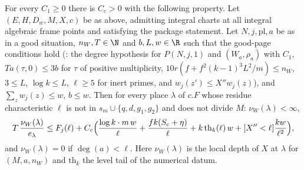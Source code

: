\begin{theorem}\label{pf:onto2:nugood}
For every $C_1\ge0$ there is $C_c>0$ with the following property. Let $(E,H,D_w,M,X,c)$ be as above, admitting integral charts at
all integral algebraic frame points and satisfying the package statement. Let $N,j,\mathrm{pl},a$ be as in a good situation, $n_W,T\in
\N$ and $b,L,w\in\R$ such that the good-page conditions hold (: the degree hypothesis for
$P(N,j,1)$ and $(W_a,\rho_a)$ with $C_1$, $Ta(\tau,0)\le3b$ for $\tau$ of positive multiplicity,
$10r(f+f^2(k-1)^3L^2/m)\le n_W$, $3\le L$, $\log k\le L$, $\ell\ge5$ for inert primes, and $w_j(z')\le X''w_j(z)$), and
$\sum_zw_j(z)\le w$, $b\le w$. Then for every place $\lambda$ of $c.F$ whose residue characteristic $\ell$ is not in
$s_m\cup\{q,d,g_1,g_2\}$ and does not divide $M$: $\nu_W(\lambda)<\infty$,
\[
T\,\frac{\nu_W(\lambda)}{e_\lambda}\le F_j(\ell)+C_c\Bigl(\frac{\log k\cdot m\,w}{\ell}+\frac{fk(S_c+\eta)}{\ell}+k\,\mathrm{th}_k(\ell)\,w
+[X''<\ell]\frac{kw}{\ell^2}\Bigr),
\]
and $\nu_W(\lambda)=0$ if $\deg(a)<\ell$. Here $\nu_W(\lambda)$ is the local depth of $X$ at $\lambda$ for $(M,a,n_W)$ and
$\mathrm{th}_k$ the level tail of the numerical datum.
\end{theorem}

